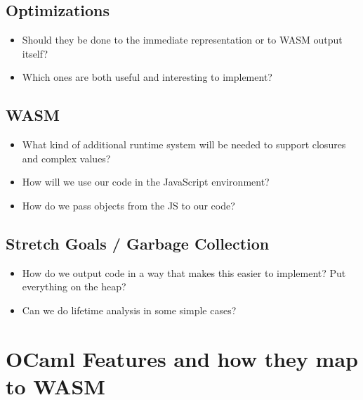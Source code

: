 \documentclass{article}
\begin{document}
\subsection{Optimizations}
\begin{itemize}
\item Should they be done to the immediate representation or to WASM output itself?
\item Which ones are both useful and interesting to implement?
\end{itemize}

\subsection{WASM}
\begin{itemize}
\item What kind of additional runtime system will be needed to support closures and complex values?
\item How will we use our code in the JavaScript environment?
\item How do we pass objects from the JS to our code?
\end{itemize}


\subsection{Stretch Goals / Garbage Collection}
\begin{itemize}
\item How do we output code in a way that makes this easier to implement? Put everything on the heap?
\item Can we do lifetime analysis in some simple cases?
\end{itemize}

\section{OCaml Features and how they map to WASM}
\end{document}
